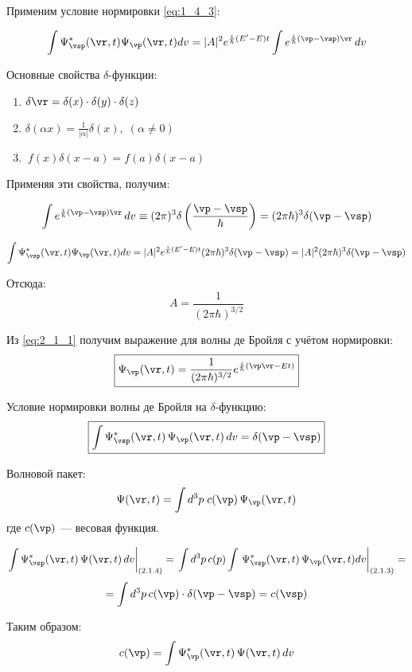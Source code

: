 Применим условие нормировки \eqref{eq:1_4_3}:

$$\int \Psi^*_{\vsp}(\vr,t) \Psi_{\vp}(\vr,t) dv = |A|^2 e^{\frac{i}{\hbar}(E' - E)t} \int e^{\frac{i}{\hbar}(\vp - \vsp)\vr} \, dv$$

Основные свойства $\delta$-функции:
\begin{enumerate}
\item $ \delta {\vr} = \delta (x) \cdot \delta (y) \cdot \delta (z) $
\item $ \delta (\alpha x) = \frac{1}{|\alpha|} \delta (x), \; (\alpha \ne 0) $
\item $~ f(x) \delta (x - a) = f(a) \delta(x-a)$
\end{enumerate}

Применяя эти свойства, получим:

$$\int e^{\frac{i}{\hbar}(\vp - \vsp)\vr} \, dv \equiv (2 \pi )^3 \delta \left( \frac{\vp - \vsp}{\hbar} \right) = (2 \pi \hbar)^3 \delta (\vp - \vsp)$$

$$\int \Psi^*_{\vsp}(\vr,t) \Psi_{\vp}(\vr,t) dv = |A|^2 e^{\frac{i}{\hbar}(E' - E)t} (2 \pi \hbar)^3 \delta (\vp - \vsp) = |A|^2 (2 \pi \hbar)^3 \delta (\vp - \vsp)$$

Отсюда: $$A = \frac{1}{(2 \pi \hbar)^{3/2}}$$

Из \eqref{eq:2_1_1} получим выражение для волны де Бройля с учётом нормировки:
\begin{equation}
\label{eq:2_1_2}
\boxed{\Psi_{\vp}(\vr,t) = \frac{1}{(2 \pi \hbar)^{3/2}} e^{\frac{i}{\hbar} (\vp \vr - Et)}}
\end{equation}

Условие нормировки волны де Бройля на $\delta$-функцию:
\begin{equation}
\label{eq:2_1_3}
\boxed{\int\Psi^*_{\vsp}(\vr,t) \, \Psi_{\vp}(\vr,t) \, dv = \delta (\vp - \vsp)}
\end{equation}

Волновой пакет:
\begin{equation}
\label{eq:2_1_4}
\Psi(\vr,t) = \int d^3p \; c(\vp) \, \Psi_{\vp}(\vr,t)
\end{equation}
где $c(\vp)$ --- весовая функция.

$$\left. \int\Psi^*_{\vsp}(\vr,t) \, \Psi(\vr,t) \, dv \right|_{(2.1.4)} = \left. \int d^3p \, c(p) \int \, \Psi^*_{\vsp}(\vr,t) \, \Psi_{\vp}(\vr,t) dv  \right|_{(2.1.3)} = $$
$$= \int d^3p \, c(\vp) \cdot \delta (\vp - \vsp) = c(\vsp)$$

Таким образом:
\begin{equation}
\label{eq:2_1_5}
c(\vp) = \int\Psi^*_{\vp}(\vr,t) \, \Psi(\vr,t) \, dv
\end{equation}

